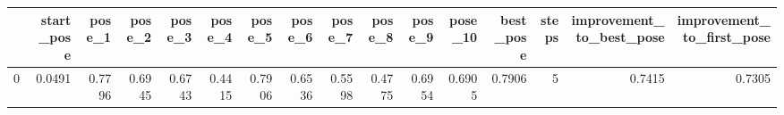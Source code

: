 \begin{tabular}{lrrrrrrrrrrrrrrr}
\toprule
{} &  start\_pose &  pose\_1 &  pose\_2 &  pose\_3 &  pose\_4 &  pose\_5 &  pose\_6 &  pose\_7 &  pose\_8 &  pose\_9 &  pose\_10 &  best\_pose &  steps &  improvement\_to\_best\_pose &  improvement\_to\_first\_pose \\
\midrule
0 &      0.0491 &  0.7796 &  0.6945 &  0.6743 &  0.4415 &  0.7906 &  0.6536 &  0.5598 &  0.4775 &  0.6954 &   0.6905 &     0.7906 &      5 &                    0.7415 &                     0.7305 \\
\bottomrule
\end{tabular}
